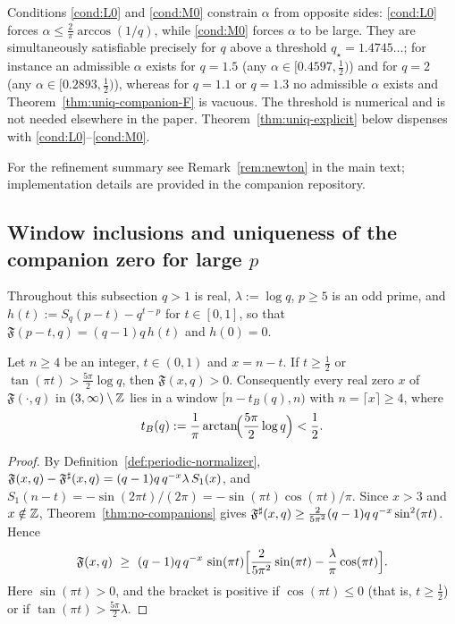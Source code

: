 \begin{remark}
Conditions \eqref{cond:L0} and \eqref{cond:M0} constrain $\alpha$ from opposite sides: \eqref{cond:L0} forces $\alpha\le\frac{2}{\pi}\arccos(1/q)$, while \eqref{cond:M0} forces $\alpha$ to be large. They are simultaneously satisfiable precisely for $q$ above a threshold $q_\star=1.4745\ldots$; for instance an admissible $\alpha$ exists for $q=1.5$ (any $\alpha\in[0.4597,\tfrac12)$) and for $q=2$ (any $\alpha\in[0.2893,\tfrac12)$), whereas for $q=1.1$ or $q=1.3$ no admissible $\alpha$ exists and Theorem~\ref{thm:uniq-companion-F} is vacuous. The threshold is numerical and is not needed elsewhere in the paper. Theorem~\ref{thm:uniq-explicit} below dispenses with \eqref{cond:L0}--\eqref{cond:M0}.
\end{remark}

\begin{remark}
For the refinement summary see Remark~\ref{rem:newton} in the main text; implementation details are provided in the companion repository.
\end{remark}

\subsection{Window inclusions and uniqueness of the companion zero for large \texorpdfstring{$p$}{p}}\label{sec:new-window}
Throughout this subsection $q>1$ is real, $\lambda:=\log q$, $p\ge5$ is an odd prime, and $h(t):=S_q(p-t)-q^{t-p}$ for $t\in[0,1]$, so that $\mathfrak F(p-t,q)=(q-1)q\,h(t)$ and $h(0)=0$.

\begin{lemma}\label{lem:window-B}
Let $n\ge4$ be an integer, $t\in(0,1)$ and $x=n-t$. If $t\ge\frac12$ or $\tan(\pi t)>\frac{5\pi}{2}\log q$, then $\mathfrak F(x,q)>0$. Consequently every real zero $x$ of $\mathfrak F(\cdot,q)$ in $(3,\infty)\setminus\mathbb{Z}$ lies in a window $[n-t_B(q),n)$ with $n=\lceil x\rceil\ge4$, where
\[
t_B(q):=\frac1\pi\arctan\!\Bigl(\frac{5\pi}{2}\log q\Bigr)<\frac12 .
\]
\end{lemma}
\begin{proof}
By Definition~\ref{def:periodic-normalizer}, $\mathfrak F(x,q)-\mathfrak F^{\sharp}(x,q)=(q-1)q\,q^{-x}\lambda\,S_1(x)$, and $S_1(n-t)=-\sin(2\pi t)/(2\pi)=-\sin(\pi t)\cos(\pi t)/\pi$. Since $x>3$ and $x\notin\mathbb{Z}$, Theorem~\ref{thm:no-companions} gives $\mathfrak F^{\sharp}(x,q)\ge\frac{2}{5\pi^2}(q-1)q\,q^{-x}\sin^2(\pi t)$. Hence
\[
\mathfrak F(x,q)\ \ge\ (q-1)q\,q^{-x}\,\sin(\pi t)\Bigl[\frac{2}{5\pi^2}\sin(\pi t)-\frac{\lambda}{\pi}\cos(\pi t)\Bigr].
\]
Here $\sin(\pi t)>0$, and the bracket is positive if $\cos(\pi t)\le0$ (that is, $t\ge\frac12$) or if $\tan(\pi t)>\frac{5\pi}{2}\lambda$.
\end{proof}

